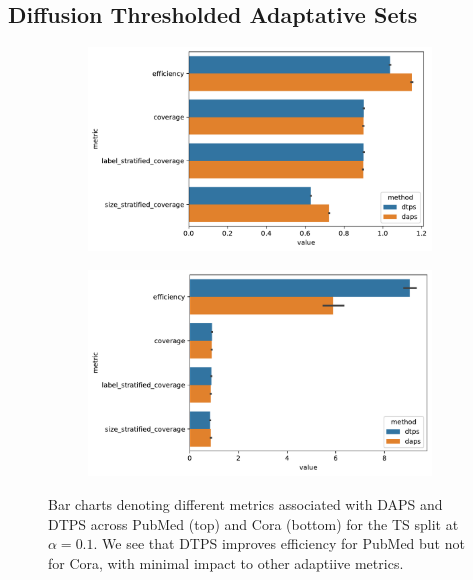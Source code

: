 \subsection{Diffusion Thresholded Adaptative Sets}
\begin{figure}
    \centering
    \begin{subfigure}{0.7\linewidth}
        \includegraphics[width=\linewidth]{graphConformal/figures/split/daps_dtps_pubmed}
    \end{subfigure}
    \begin{subfigure}{0.7\linewidth}
        \includegraphics[width=\linewidth]{graphConformal/figures/split/daps_dtps_cora}
    \end{subfigure}
    \caption{Bar charts denoting different metrics associated with DAPS and DTPS across PubMed (top) and Cora (bottom) for the TS split at $\alpha=0.1$. We see that DTPS improves efficiency for PubMed but not for Cora, with minimal impact to other adaptiive metrics.}
    \label{fig:fs:conformal:daps_vs_dtps}
\end{figure}


